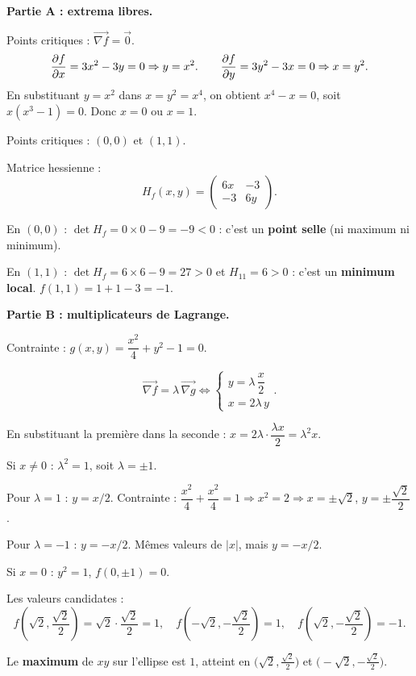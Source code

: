 \documentclass[12pt,a4paper]{article}
\begin{document}
\begin{boitecorrige}
\textbf{Partie A : extrema libres.}

Points critiques : $\overrightarrow{\nabla f} = \vec{0}$.
\[
\dfrac{\partial f}{\partial x} = 3x^2 - 3y = 0 \Rightarrow y = x^2.
\qquad
\dfrac{\partial f}{\partial y} = 3y^2 - 3x = 0 \Rightarrow x = y^2.
\]
En substituant $y = x^2$ dans $x = y^2 = x^4$, on obtient $x^4 - x = 0$, soit $x(x^3-1) = 0$. Donc $x = 0$ ou $x = 1$.

Points critiques : $(0,0)$ et $(1,1)$.

Matrice hessienne :
\[
H_f(x,y) = \begin{pmatrix} 6x & -3 \\ -3 & 6y \end{pmatrix}.
\]

En $(0,0)$ : $\det H_f = 0 \times 0 - 9 = -9 < 0$ : c'est un \textbf{point selle} (ni maximum ni minimum).

En $(1,1)$ : $\det H_f = 6\times6 - 9 = 27 > 0$ et $H_{11} = 6 > 0$ : c'est un \textbf{minimum local}. $f(1,1) = 1 + 1 - 3 = -1$.

\textbf{Partie B : multiplicateurs de Lagrange.}

Contrainte : $g(x,y) = \dfrac{x^2}{4} + y^2 - 1 = 0$.

\[
\overrightarrow{\nabla f} = \lambda\,\overrightarrow{\nabla g} \Leftrightarrow
\begin{cases} y = \lambda\,\dfrac{x}{2} \\[4pt] x = 2\lambda\,y \end{cases}.
\]

En substituant la première dans la seconde : $x = 2\lambda \cdot \dfrac{\lambda x}{2} = \lambda^2 x$.

Si $x \neq 0$ : $\lambda^2 = 1$, soit $\lambda = \pm 1$.

Pour $\lambda = 1$ : $y = x/2$. Contrainte : $\dfrac{x^2}{4} + \dfrac{x^2}{4} = 1 \Rightarrow x^2 = 2 \Rightarrow x = \pm\sqrt{2}$, $y = \pm\dfrac{\sqrt{2}}{2}$.

Pour $\lambda = -1$ : $y = -x/2$. Mêmes valeurs de $|x|$, mais $y = -x/2$.

Si $x = 0$ : $y^2 = 1$, $f(0,\pm1) = 0$.

Les valeurs candidates :
\[
f\!\left(\sqrt{2},\frac{\sqrt{2}}{2}\right) = \sqrt{2}\cdot\frac{\sqrt{2}}{2} = 1, \quad
f\!\left(-\sqrt{2},-\frac{\sqrt{2}}{2}\right) = 1, \quad
f\!\left(\sqrt{2},-\frac{\sqrt{2}}{2}\right) = -1.
\]

Le \textbf{maximum} de $xy$ sur l'ellipse est $\boxed{1}$, atteint en $\bigl(\sqrt{2}, \tfrac{\sqrt{2}}{2}\bigr)$ et $\bigl(-\sqrt{2}, -\tfrac{\sqrt{2}}{2}\bigr)$.
\end{boitecorrige}
\end{document}
